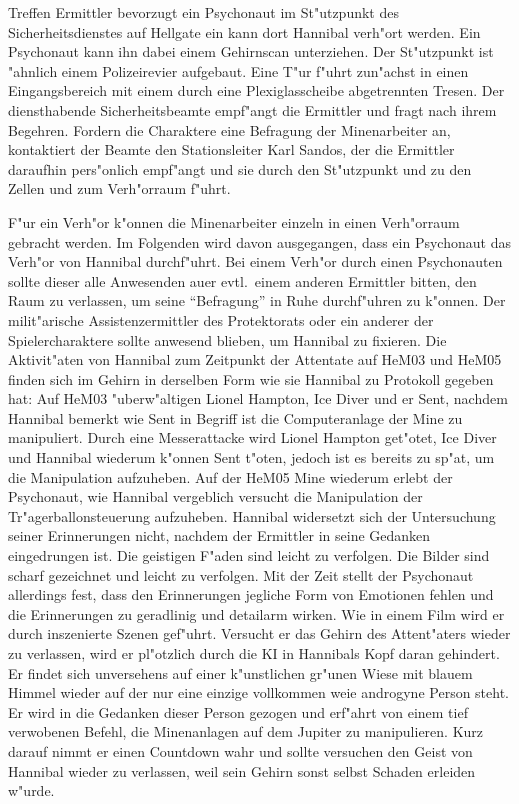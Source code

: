 
Treffen Ermittler bevorzugt ein Psychonaut im St"utzpunkt des Sicherheitsdienstes auf Hellgate ein kann dort Hannibal verh"ort werden. Ein Psychonaut kann ihn dabei einem Gehirnscan unterziehen. Der St"utzpunkt ist "ahnlich einem Polizeirevier aufgebaut. Eine T"ur f"uhrt zun"achst in einen Eingangsbereich mit einem durch eine Plexiglasscheibe abgetrennten Tresen. Der diensthabende Sicherheitsbeamte empf"angt die Ermittler und fragt nach ihrem Begehren. Fordern die Charaktere eine Befragung der Minenarbeiter an, kontaktiert der Beamte den Stationsleiter Karl Sandos, der die Ermittler daraufhin pers"onlich empf"angt und sie durch den St"utzpunkt und zu den Zellen und zum Verh"orraum f"uhrt.

F"ur ein Verh"or k"onnen die Minenarbeiter einzeln in einen Verh"orraum gebracht werden. Im Folgenden wird davon ausgegangen, dass ein Psychonaut das Verh"or von Hannibal durchf"uhrt. Bei einem Verh"or durch einen Psychonauten sollte dieser alle Anwesenden au\3er evtl.~einem anderen Ermittler bitten, den Raum zu verlassen, um seine "`Befragung"' in Ruhe durchf"uhren zu k"onnen. Der milit"arische Assistenzermittler des Protektorats oder ein anderer der Spielercharaktere sollte anwesend blieben, um Hannibal zu fixieren. Die Aktivit"aten von Hannibal zum Zeitpunkt der Attentate auf HeM03 und HeM05 finden sich im Gehirn in derselben Form wie sie Hannibal zu Protokoll gegeben hat: Auf HeM03 "uberw"altigen Lionel Hampton, Ice Diver und er Sent, nachdem Hannibal bemerkt wie Sent in Begriff ist die Computeranlage der Mine zu manipuliert. Durch eine Messerattacke wird Lionel Hampton get"otet, Ice Diver und Hannibal wiederum k"onnen Sent t"oten, jedoch ist es bereits zu sp"at, um die Manipulation aufzuheben. Auf der HeM05 Mine wiederum erlebt der Psychonaut, wie Hannibal vergeblich versucht die Manipulation der Tr"agerballonsteuerung aufzuheben. Hannibal widersetzt sich der Untersuchung seiner Erinnerungen nicht, nachdem der Ermittler in seine Gedanken eingedrungen ist. Die geistigen F"aden sind leicht zu verfolgen. Die Bilder sind scharf gezeichnet und leicht zu verfolgen. Mit der Zeit stellt der Psychonaut allerdings fest, dass den Erinnerungen jegliche Form von Emotionen fehlen und die Erinnerungen zu geradlinig und detailarm wirken. Wie in einem Film wird er durch inszenierte Szenen gef"uhrt. Versucht er das Gehirn des Attent"aters wieder zu verlassen, wird er pl"otzlich durch die KI in Hannibals Kopf daran gehindert. Er findet sich unversehens auf einer k"unstlichen gr"unen Wiese mit blauem Himmel wieder auf der nur eine einzige vollkommen wei\3e androgyne Person steht. Er wird in die Gedanken dieser Person gezogen und erf"ahrt von einem tief verwobenen Befehl, die Minenanlagen auf dem Jupiter zu manipulieren. Kurz darauf nimmt er einen Countdown wahr und sollte versuchen den Geist von Hannibal wieder zu verlassen, weil sein Gehirn sonst selbst Schaden erleiden w"urde.

